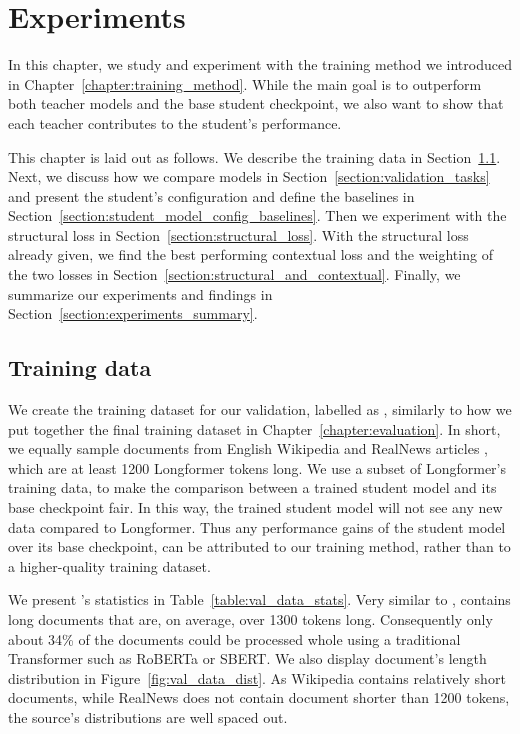 \chapter{Experiments}\label{chapter:experiments}

In this chapter, we study and experiment with the training method we introduced
in Chapter~\ref{chapter:training_method}. While the main goal is to outperform
both teacher models and the base student checkpoint, we also want to show that
each teacher contributes to the student's performance.

This chapter is laid out as follows. We describe the training data in
Section~\ref{section:val_training_data}. Next, we discuss how we compare models
in Section~\ref{section:validation_tasks} and present the student's
configuration and define the baselines in
Section~\ref{section:student_model_config_baselines}. Then we experiment with
the structural loss in Section~\ref{section:structural_loss}. With the
structural loss already given, we find the best performing contextual loss and
the weighting of the two losses in Section~\ref{section:structural_and_contextual}.
Finally, we summarize our experiments and findings in
Section~\ref{section:experiments_summary}.

\section{Training data}\label{section:val_training_data}

We create the training dataset for our validation, labelled as
, similarly to how we put together the final training
dataset  in Chapter~\ref{chapter:evaluation}. In short,
we equally sample documents from English Wikipedia and RealNews articles
\citep{zellers2019defending}, which are at least 1200 Longformer tokens long.
We use a subset of Longformer's training data, to make the comparison between a
trained student model and its base checkpoint fair. In this way, the trained
student model will not see any new data compared to Longformer. Thus any
performance gains of the student model over its base checkpoint, can be
attributed to our training method, rather than to a higher-quality training
dataset.

We present 's statistics in
Table~\ref{table:val_data_stats}. Very similar to ,
 contains long documents that are, on average, over 1300
tokens long. Consequently only about 34\% of the documents could be processed
whole using a traditional Transformer such as RoBERTa \citep{liu2019roberta} or
SBERT. We also display document's length distribution in
Figure~\ref{fig:val_data_dist}. As Wikipedia contains relatively short
documents, while RealNews does not contain document shorter than 1200 tokens,
the source's distributions are well spaced out.


